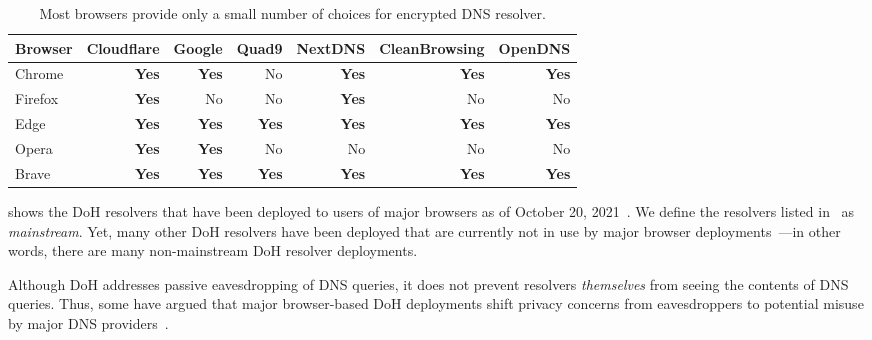 \begin{table}[t]
    \centering
    \begin{tabular}{l|rrrrrr}
    \hline
    Browser & Cloudflare & Google & Quad9 & NextDNS & CleanBrowsing & OpenDNS
    \\
    \midrule
    Chrome    & \textbf{Yes} & \textbf{Yes} & No & \textbf{Yes} & \textbf{Yes} & \textbf{Yes} \\
    Firefox  & \textbf{Yes} & No & No & \textbf{Yes} & No & No \\ 
    Edge   & \textbf{Yes} & \textbf{Yes} & \textbf{Yes} & \textbf{Yes} & \textbf{Yes} & \textbf{Yes} \\
    Opera            & \textbf{Yes} & \textbf{Yes} & No & No & No & No \\
    Brave            & \textbf{Yes} & \textbf{Yes} & \textbf{Yes} & \textbf{Yes} & \textbf{Yes} & \textbf{Yes} \\
    \bottomrule
    \end{tabular}
    \caption{Most browsers provide only a small number of choices for encrypted DNS resolver.}
    \label{tab:SupportedResolvers}
\end{table}

 shows the DoH resolvers that have been deployed
to users of major browsers as of October 20,
2021~\cite{bravebrowser,edgebrowser,ffbrowser,chromebrowser,operabrowser}.  We
define the resolvers listed in~ as {\em
mainstream}.
Yet, many other DoH resolvers have been deployed that are currently
not in use by major browser deployments~\cite{dnscrypt}---in other words,
there are many non-mainstream DoH resolver deployments.  

Although DoH
addresses passive eavesdropping of DNS queries, it does not prevent resolvers
\emph{themselves} from seeing the contents of DNS queries.  Thus, some have
argued that major browser-based DoH deployments shift privacy concerns from
eavesdroppers to potential misuse by major DNS providers~\cite{vixie}.

